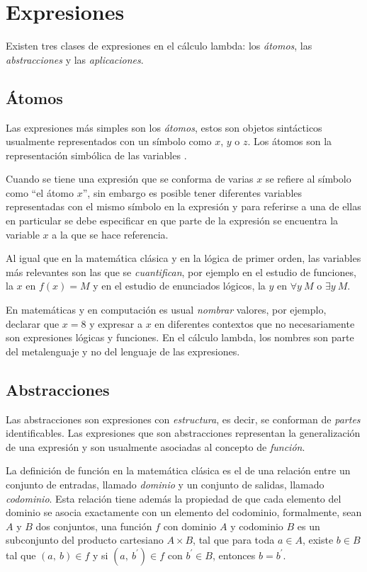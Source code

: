 \section{Expresiones}
\label{sec:expresiones}

Existen tres clases de expresiones en el cálculo lambda: los \emph{átomos}, las \emph{abstracciones} y las \emph{aplicaciones}.

\subsection{Átomos}
\label{sec:atomos}

Las expresiones más simples son los \emph{átomos}, estos son objetos sintácticos usualmente representados con un símbolo como \( x \), \( y \) o \( z \). Los átomos son la representación simbólica de las variables \cite[p.~577]{Barendregt:Bible}.

Cuando se tiene una expresión que se conforma de varias \( x \) se refiere al símbolo como ``el átomo \( x \)'', sin embargo es posible tener diferentes variables representadas con el mismo símbolo en la expresión y para referirse a una de ellas en particular se debe especificar en que parte de la expresión se encuentra la variable \( x \) a la que se hace referencia.

Al igual que en la matemática clásica y en la lógica de primer orden, las variables más relevantes son las que se \emph{cuantifican}, por ejemplo en el estudio de funciones, la \( x \) en \( f(x) = M \) y en el estudio de enunciados lógicos, la \( y \) en \( \forall y\ M \) o \( \exists y\ M \).

En matemáticas y en computación es usual \emph{nombrar} valores, por ejemplo, declarar que \( x = 8 \) y expresar a \( x \) en diferentes contextos que no necesariamente son expresiones lógicas y funciones. En el cálculo lambda, los nombres son parte del metalenguaje y no del lenguaje de las expresiones.

\subsection{Abstracciones}
\label{sec:abstracciones}

Las abstracciones son expresiones con \emph{estructura}, es decir, se conforman de \emph{partes} identificables. Las expresiones que son abstracciones representan la generalización de una expresión y son usualmente asociadas al concepto de \emph{función}.

La definición de función en la matemática clásica es el de una relación entre un conjunto de entradas, llamado \emph{dominio} y un conjunto de salidas, llamado \emph{codominio}. Esta relación tiene además la propiedad de que cada elemento del dominio se asocia exactamente con un elemento del codominio, formalmente, sean \( A \) y \( B \) dos conjuntos, una función \( f \) con dominio \( A \) y codominio \( B \) es un subconjunto del producto cartesiano \( A \times B \), tal que para toda \( a \in A \), existe \( b \in B \) tal que \( (a,\ b) \in f \) y si \( (a,\ b^{\prime}) \in f \) con \( b^{\prime} \in B \), entonces \( b=b^{\prime} \).

